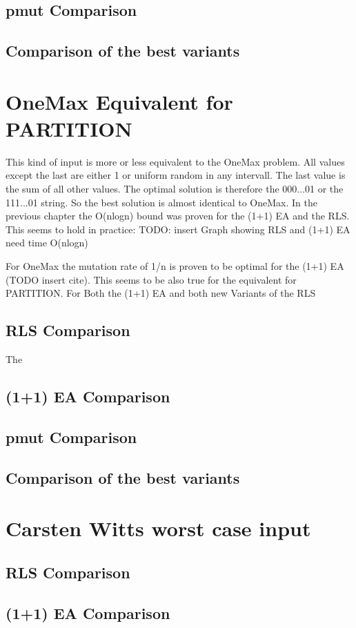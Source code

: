 \subsection{pmut Comparison}
\subsection{Comparison of the best variants}

\section{OneMax Equivalent for PARTITION}
This kind of input is more or less equivalent to the OneMax problem. All values except the last are either 1 or uniform
random in any intervall. The last value is the sum of all other values. The optimal solution is therefore the 000...01 or
the 111...01 string. So the best solution is almost identical to OneMax. In the previous chapter the O(nlogn) bound was
proven for the (1+1) EA and the RLS. This seems to hold in practice:
TODO: insert Graph showing RLS and (1+1) EA need time O(nlogn)

For OneMax the mutation rate of 1/n is proven to be optimal for the (1+1) EA (TODO insert cite). This seems to be also
true for the equivalent for PARTITION. For Both the (1+1) EA and both new Variants of the RLS
\subsection{RLS Comparison}
The
\subsection{(1+1) EA Comparison}
\subsection{pmut Comparison}
\subsection{Comparison of the best variants}

\section{Carsten Witts worst case input}
\subsection{RLS Comparison}
\subsection{(1+1) EA Comparison}
